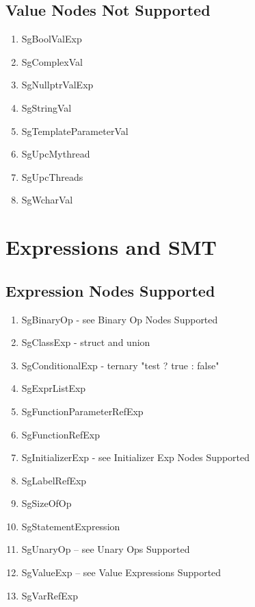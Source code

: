 \documentclass[11pt]{article}
\begin{document}
{\begin{enumeration}
\subsection{Value Nodes Not Supported}
\begin{enumerate}
\item SgBoolValExp
\item SgComplexVal
\item SgNullptrValExp
\item SgStringVal
\item SgTemplateParameterVal
\item SgUpcMythread
\item SgUpcThreads
\item SgWcharVal
\end{enumerate}

\section{Expressions and SMT}
\subsection{Expression Nodes Supported}
\begin{enumerate}
\item SgBinaryOp - see Binary Op Nodes Supported
\item SgClassExp - struct and union
\item SgConditionalExp - ternary "test ? true : false"
\item SgExprListExp 
\item SgFunctionParameterRefExp
\item SgFunctionRefExp
\item SgInitializerExp - see Initializer Exp Nodes Supported
\item SgLabelRefExp
\item SgSizeOfOp
\item SgStatementExpression
\item SgUnaryOp -- see Unary Ops Supported
\item SgValueExp -- see Value Expressions Supported
\item SgVarRefExp 

\end{enumerate}


\end{enumeration}}
\end{document}
